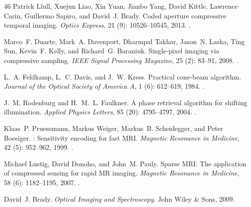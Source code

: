 \documentclass[11pt]{article}
\begin{document}
\begin{thebibliography}{46}
Patrick Llull, Xuejun Liao, Xin Yuan, Jianbo Yang, David Kittle, Lawrence
  Carin, Guillermo Sapiro, and David~J. Brady.
\newblock Coded aperture compressive temporal imaging.
\newblock \emph{Optics Express}, 21 (9): 10526--10545, 2013.
\newblock {}.

Marco~F. Duarte, Mark~A. Davenport, Dharmpal Takhar, Jason~N. Laska, Ting Sun,
  Kevin~F. Kelly, and Richard~G. Baraniuk.
\newblock Single-pixel imaging via compressive sampling.
\newblock \emph{IEEE Signal Processing Magazine}, 25 (2):
  83--91, 2008.
\newblock {}.

L.~A. Feldkamp, L.~C. Davis, and J.~W. Kress.
\newblock Practical cone-beam algorithm.
\newblock \emph{Journal of the Optical Society of America A}, 1
  (6): 612--619, 1984.
\newblock {}.

J.~M. Rodenburg and H.~M.~L. Faulkner.
\newblock A phase retrieval algorithm for shifting illumination.
\newblock \emph{Applied Physics Letters}, 85 (20):
  4795--4797, 2004.
\newblock {}.

Klaas~P. Pruessmann, Markus Weiger, Markus~B. Scheidegger, and Peter Boesiger.
: Sensitivity encoding for fast {MRI}.
\newblock \emph{Magnetic Resonance in Medicine}, 42 (5):
  952--962, 1999.
\newblock {}.

Michael Lustig, David Donoho, and John~M. Pauly.
\newblock Sparse {MRI}: The application of compressed sensing for rapid {MR}
  imaging.
\newblock \emph{Magnetic Resonance in Medicine}, 58 (6):
  1182--1195, 2007.
\newblock {}.

David~J. Brady.
\newblock \emph{Optical Imaging and Spectroscopy}.
\newblock John Wiley \& Sons, 2009.


\end{thebibliography}
\end{document}
